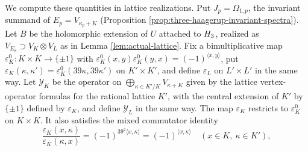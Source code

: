 \documentclass[leqno]{article}
\let\cal\relax
\newcommand{\cal}{\mathcal}
\newcommand{\co}{\colon}
\newcommand{\ot}{\otimes}
\newcommand{\epsi}{\varepsilon}
\numberwithin{equation}{section}
\begin{document}
We compute these quantities in lattice realizations. Put $J_p = \Omega_{1,p}$, the invariant summand of $E_p = V_{\kappa_p+K}$ (Proposition \ref{prop:three-haagerup-invariant-spectra}). Let $B$ be the holomorphic extension of $U$ attached to $\cal H_3$, realized as $V_{E_8} \supset V_K\ot V_L$ as in Lemma \ref{lem:actual-lattice}. Fix a bimultiplicative map $\epsi^0_K \co K\times K \to \{\pm1\}$ with $\epsi^0_K(x,y)\epsi^0_K(y,x) = (-1)^{\langle x,y\rangle}$, put $\epsi_K(\kappa,\kappa') = \epsi^0_K(39\kappa,39\kappa')$ on $K'\times K'$, and define $\epsi_L$ on $L'\times L'$ in the same way. Let $\mathcal Y_K$ be the operator on $\bigoplus_{\kappa \in K'/K}V_{\kappa+K}$ given by the lattice vertex-operator formulas \cite[(6.4.62) p.~233 and (6.4.68) p.~234]{LL04} for the rational lattice $K'$, with the central extension of $K'$ by $\{\pm1\}$ defined by $\epsi_K$, and define $\mathcal Y_L$ in the same way. The map $\epsi_K$ restricts to $\epsi^0_K$ on $K\times K$. It also satisfies the mixed commutator identity
\[
\frac{\epsi_K(x,\kappa)}{\epsi_K(\kappa,x)}
= (-1)^{39^2\langle x,\kappa\rangle}
= (-1)^{\langle x,\kappa\rangle}
\quad (x \in K,\ \kappa \in K'),
\]
\end{document}
